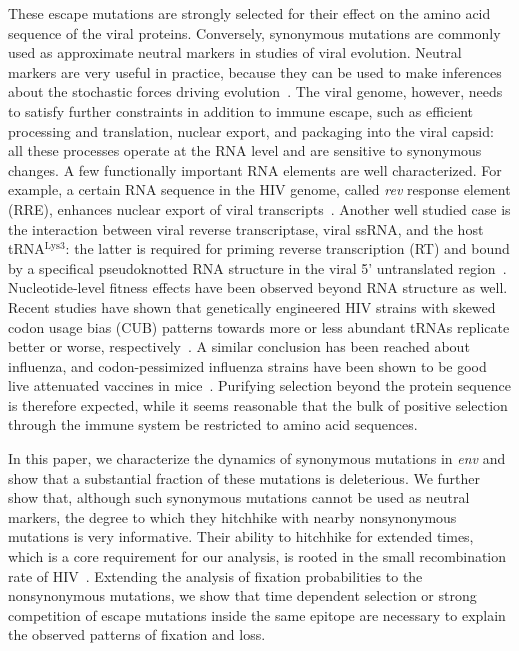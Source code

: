 \documentclass[rmp, twocolumn]{revtex4}
\newcommand{\rev}{\textit{rev}}
\newcommand{\env}{\textit{env}}
\begin{document}
These escape mutations are strongly selected for their effect on the amino acid
sequence of the viral proteins. Conversely, synonymous mutations are commonly
used as approximate neutral markers in studies of viral evolution. Neutral
markers are very useful in practice, because they can be used to make inferences
about the stochastic forces driving evolution~\citep{yang_statistical_2000}.
The viral genome, however, needs to satisfy further constraints in addition to
immune escape, such as efficient processing and translation, nuclear export, and
packaging into the viral capsid: all these processes operate at the RNA level
and are sensitive to synonymous changes. A few functionally important RNA
elements are well characterized. For example, a certain RNA sequence in the HIV
genome, called \rev{} response element (RRE), enhances nuclear export of viral
transcripts~\citep{fernandes_hiv-1_2012}. Another well studied case is the
interaction between viral reverse transcriptase, viral ssRNA, and the host
tRNA$^\text{Lys3}$: the latter is required for priming reverse transcription
(RT) and bound by a specifical pseudoknotted RNA structure in the viral 5'
untranslated region~\citep{barat_interaction_1991, paillart_vitro_2002}.
Nucleotide-level fitness effects have been observed beyond RNA structure as
well. Recent studies have shown that genetically engineered HIV strains with
skewed codon usage bias (CUB) patterns towards more or less abundant tRNAs
replicate better or worse, respectively~\citep{ngumbela_quantitative_2008,
li_codon-usage-based_2012}. A similar conclusion has been reached about
influenza, and codon-pessimized influenza strains have been shown to be good
live attenuated vaccines in mice~\citep{mueller_live_2010}. Purifying selection
beyond the protein sequence is therefore expected, while it seems reasonable
that the bulk of positive selection through the immune system be restricted to
amino acid sequences.


In this paper, we characterize the dynamics of synonymous mutations in \env{}
and show that a substantial fraction of these mutations is deleterious. We
further show that, although such synonymous mutations cannot be used as neutral
markers, the degree to which they hitchhike with nearby nonsynonymous mutations
is very informative. Their ability to hitchhike for extended times, which is a
core requirement for our analysis, is rooted in the small recombination rate of
HIV~\citep{neher_recombination_2010, batorsky_estimate_2011}. Extending the
analysis of fixation probabilities to the nonsynonymous mutations, we show that
time dependent selection or strong competition of escape mutations inside the
same epitope are necessary to explain the observed patterns of fixation and
loss.
\end{document}
